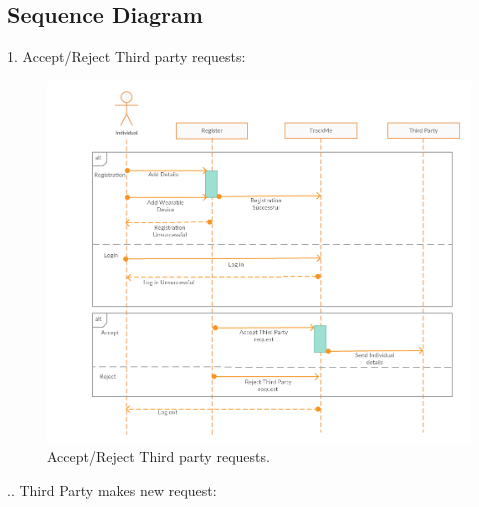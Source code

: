 \subsection{Sequence Diagram}
1. Accept/Reject Third party requests:
\begin{figure}[H]
	\begin{center}
		\includegraphics[width=\textwidth]{./Sequence/1__Individual.png}
      	\caption{Accept/Reject Third party requests.}
        \label{TrackMe_seq1}
	\end{center}
\end{figure}
.\newline\newline\newline\newline\newline\newline\newline\newline\newline\newline{}. Third Party makes new request:
